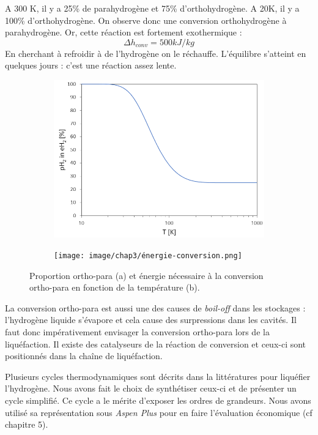 \documentclass[11pt,french,a4paper]{article}
\begin{document}
A 300 K, il y a 25\% de parahydrogène et 75\% d'orthohydrogène. A 20K, il y a 100\% d'orthohydrogène. On observe donc une conversion orthohydrogène à parahydrogène. Or, cette réaction est fortement exothermique : 
 $$ \Delta h _{conv} =500kJ/kg$$
En cherchant à refroidir à de l'hydrogène on le réchauffe. L'équilibre s'atteint en quelques jours : c'est une réaction assez lente.

\begin{figure}[h]
  \centering
  \begin{subfigure}[b]{0.4\linewidth}
    \includegraphics[width=\linewidth]{image/chap3/proportion_o-p.png}
    \caption{ }
  \end{subfigure}
  \hspace{0.1cm}
  \begin{subfigure}[b]{0.4\linewidth}
    \texttt{[image: image/chap3/énergie-conversion.png]}
    \caption{ }
  \end{subfigure}
  \caption{Proportion ortho-para (a) et énergie nécessaire à la conversion ortho-para en fonction de la température (b).}
\end{figure}

La conversion ortho-para est aussi une des causes de \emph{boil-off} dans les stockages : l'hydrogène liquide s'évapore et cela cause des surpressions dans les cavités. Il faut donc impérativement envisager la conversion ortho-para lors de la liquéfaction. Il existe des catalyseurs de la réaction de conversion et ceux-ci sont positionnés dans la chaîne de liquéfaction. 

Plusieurs cycles thermodynamiques sont décrits dans la littératures pour liquéfier l'hydrogène. Nous avons fait le choix de synthétiser ceux-ci et de présenter un cycle simplifié. Ce cycle a le mérite d'exposer les ordres de grandeurs. Nous avons utilisé sa représentation sous \emph{Aspen Plus} pour en faire l'évaluation économique (cf chapitre 5).
\end{document}
